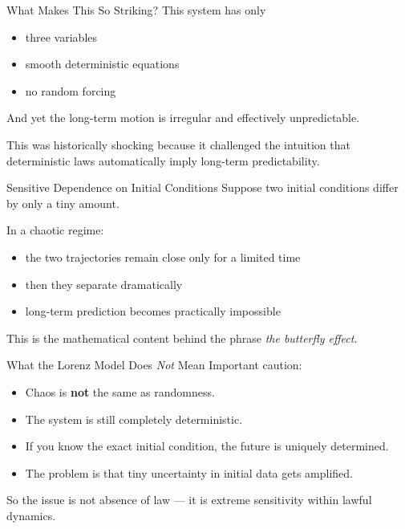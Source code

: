 \documentclass[aspectratio=169]{beamer}
\begin{document}
\begin{frame}{What Makes This So Striking?}
This system has only
\begin{itemize}
\item three variables
\item smooth deterministic equations
\item no random forcing
\end{itemize}

And yet the long-term motion is irregular and effectively unpredictable.

\vspace{0.8em}

This was historically shocking because it challenged the intuition that deterministic laws automatically imply long-term predictability.
\end{frame}

\begin{frame}{Sensitive Dependence on Initial Conditions}
Suppose two initial conditions differ by only a tiny amount.

In a chaotic regime:
\begin{itemize}
\item the two trajectories remain close only for a limited time
\item then they separate dramatically
\item long-term prediction becomes practically impossible
\end{itemize}

This is the mathematical content behind the phrase \emph{the butterfly effect}.
\end{frame}

\begin{frame}{What the Lorenz Model Does \emph{Not} Mean}
Important caution:
\begin{itemize}
\item Chaos is \textbf{not} the same as randomness.
\item The system is still completely deterministic.
\item If you know the exact initial condition, the future is uniquely determined.
\item The problem is that tiny uncertainty in initial data gets amplified.
\end{itemize}

So the issue is not absence of law --- it is extreme sensitivity within lawful dynamics.
\end{frame}
\end{document}
